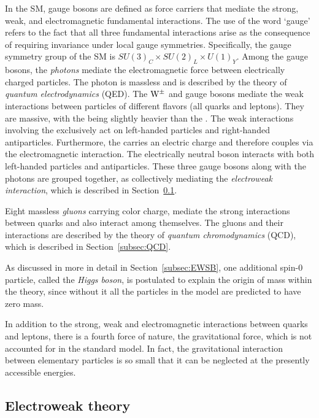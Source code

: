 In the SM, gauge bosons are defined as force carriers that mediate the strong, weak, and electromagnetic fundamental interactions.
The use of the word `gauge' refers to the fact that all three fundamental interactions arise as the consequence of requiring invariance under local gauge symmetries. 
Specifically, the gauge symmetry group of the SM is $SU(3)_C \times SU(2)_L \times U(1)_Y$.
Among the gauge bosons, the \textit{photons} mediate the electromagnetic force between electrically charged particles.
The photon is massless and is described by the theory of \textit{quantum electrodynamics} (QED).
The $\mathrm{W}^{\pm}$ and \PZ gauge bosons mediate the weak interactions between particles of different flavors (all quarks and leptons).
They are massive, with the \PZ being slightly heavier than the \PW.
The weak interactions involving the \PW exclusively act on left-handed particles and right-handed antiparticles.
Furthermore, the \PW carries an electric charge and therefore couples via the electromagnetic interaction.
The electrically neutral \PZ boson interacts with both left-handed particles and antiparticles.
These three gauge bosons along with the photons are grouped together, as collectively mediating the \textit{electroweak interaction}, which is described in Section~\ref{subsec:EWtheory}.

Eight massless \textit{gluons} carrying color charge, mediate the strong interactions between quarks and also interact among themselves.
The gluons and their interactions are described by the theory of \textit{quantum chromodynamics} (QCD), which is described in Section~\ref{subsec:QCD}.

As discussed in more in detail in Section~\ref{subsec:EWSB}, one additional spin-0 particle, called the \textit{Higgs boson}, is postulated to explain the origin of mass within the theory,
since without it all the particles in the model are predicted to have zero mass.

In addition to the strong, weak and electromagnetic interactions between quarks and leptons, there is a fourth force of nature, the gravitational force, which is not accounted for in the standard model.
In fact, the gravitational interaction between elementary particles is so small that it can be neglected at the presently accessible energies.

\subsection{Electroweak theory}\label{subsec:EWtheory}

